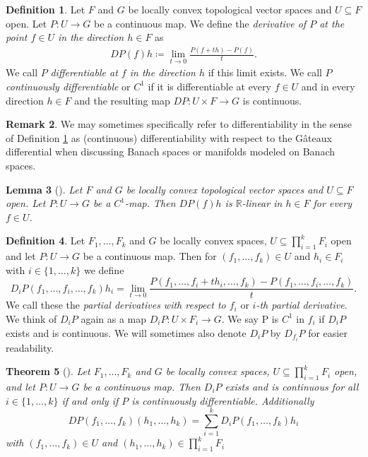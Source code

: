 \documentclass[12pt,a4paper]{article}
\theoremstyle{plain}
\newtheorem{theorem}{Theorem}[subsection]
\newtheorem{lemma}[theorem]{Lemma}
\theoremstyle{definition}
\newtheorem{definition}[theorem]{Definition}
\newtheorem{remark}[theorem]{Remark}
\newcommand{\R}{\mathbb{R}}
\begin{document}
\begin{definition}
\label{Def:GateauxDifferentiability}
Let $F$ and $G$ be locally convex topological vector spaces and $U\subseteq F$ open. Let $P:U\to G$ be a continuous map. We define the \textit{derivative of $P$ at the point $f\in U$ in the direction $h\in F$} as
\begin{align*}
    DP(f)h\coloneqq \lim_{t\to 0}\frac{P(f+th)-P(f)}{t}.
\end{align*}
We call $P$ \textit{differentiable at $f$ in the direction $h$} if this limit exists. We call $P$ \textit{continuously differentiable} or $C^1$ if it is differentiable at every $f\in U$ and in every direction $h\in F$ and the resulting map $DP:U\times F\to G$ is continuous.
\end{definition}

\begin{remark}
We may sometimes specifically refer to differentiability in the sense of Definition \ref{Def:GateauxDifferentiability} as (continuous) differentiability with respect to the Gâteaux differential when discussing Banach spaces or manifolds modeled on Banach spaces. 
\end{remark}

\begin{lemma}[{\cite[Lemma II.2.3]{InfDimLieneeb}}]
\label{Lemma:DP(f)Lin}
Let $F$ and $G$ be locally convex topological vector spaces and $U\subseteq F$ open. Let $P:U\to G$ be a $C^1$-map. Then $DP(f)h$ is $\R$-linear in $h\in F$ for every $f\in U$.
\end{lemma}


\begin{definition}
Let $F_1,\ldots,F_k$ and $G$ be locally convex spaces, $U\subseteq \prod_{i=1}^k F_i$ open and let $P:U \to G$ be a continuous map. Then for $(f_1,\ldots,f_k)\in U$ and $h_i\in F_i$ with $i\in \{1,\ldots,k\}$ we define
\begin{equation*}
    D_iP(f_1,\ldots,f_i,\ldots,f_k)h_i=\lim_{t\to 0}\frac{P(f_1,\ldots,f_i+th_i,\ldots,f_k)-P(f_1,\ldots,f_i,\ldots,f_k)}{t}.
\end{equation*}
We call these the \textit{partial derivatives with respect to $f_i$} or \textit{$i$-th partial derivative}. We think of $D_iP$ again as a map $D_iP:U\times F_i \to G$. We say P is $C^1$ in $f_i$ if $D_iP$ exists and is continuous. We will sometimes also denote $D_iP$ by $D_{f_i}P$ for easier readability. 
\end{definition}

\begin{theorem}[{\cite[Proposition II.2.6]{InfDimLieneeb}}]
\label{Thm:PartialDer}
Let $F_1,\ldots,F_k$ and $G$ be locally convex spaces, $U\subseteq \prod_{i=1}^k F_i$ open, and let $P:U \to G$ be a continuous map.
Then $D_iP$ exists and is continuous for all $i\in\{1,\ldots,k\}$ if and only if $P$ is continuously differentiable. Additionally 
\begin{equation*}
    DP(f_1,\ldots,f_k)(h_1,\ldots,h_k)=\sum_{i=1}^k D_iP(f_1,\ldots,f_k)h_i
\end{equation*}
with $(f_1,\ldots,f_k)\in U$ and $(h_1,\ldots,h_k)\in \prod_{i=1}^k F_i$
\end{theorem}
\end{document}
